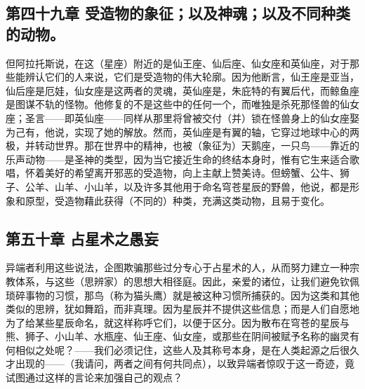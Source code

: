 \par


\subsection{第四十九章 受造物的象征；以及神魂；以及不同种类的动物。}

但阿拉托斯说，在这（星座）附近的是仙王座、仙后座、仙女座和英仙座，对于那些能辨认它们的人来说，它们是受造物的伟大轮廓。因为他断言，仙王座是亚当，仙后座是厄娃，仙女座是这两者的灵魂，英仙座是，朱庇特的有翼后代，而鲸鱼座是图谋不轨的怪物。他修复的不是这些中的任何一个，而唯独是杀死那怪兽的仙女座；圣言——即英仙座——同样从那里将曾被交付（并）锁在怪兽身上的仙女座娶为己有，他说，实现了她的解放。然而，英仙座是有翼的轴，它穿过地球中心的两极，并转动世界。那在世界中的精神，也被（象征为）天鹅座，一只鸟——靠近的乐声动物——是圣神的类型，因为当它接近生命的终结本身时，惟有它生来适合歌唱，怀着美好的希望离开邪恶的受造物，向上主献上赞美诗。但螃蟹、公牛、狮子、公羊、山羊、小山羊，以及许多其他用于命名穹苍星辰的野兽，他说，都是形象和原型，受造物藉此获得（不同的）种类，充满这类动物，且易于变化。\par


\subsection{第五十章 占星术之愚妄}

异端者利用这些说法，企图欺骗那些过分专心于占星术的人，从而努力建立一种宗教体系，与这些（思辨家）的思想大相径庭。因此，亲爱的诸位，让我们避免钦佩琐碎事物的习惯，那鸟（称为猫头鹰）就是被这种习惯所捕获的。因为这类和其他类似的思辨，犹如舞蹈，而非真理。因为星辰并不提供这些信息；而是人们自愿地为了给某些星辰命名，就这样称呼它们，以便于区分。因为散布在穹苍的星辰与熊、狮子、小山羊、水瓶座、仙王座、仙女座，或那些在阴间被赋予名称的幽灵有何相似之处呢？——我们必须记住，这些人及其称号本身，是在人类起源之后很久才出现的——（我请问，两者之间有何共同点），以致异端者惊叹于这一奇迹，竟试图通过这样的言论来加强自己的观点？\par


